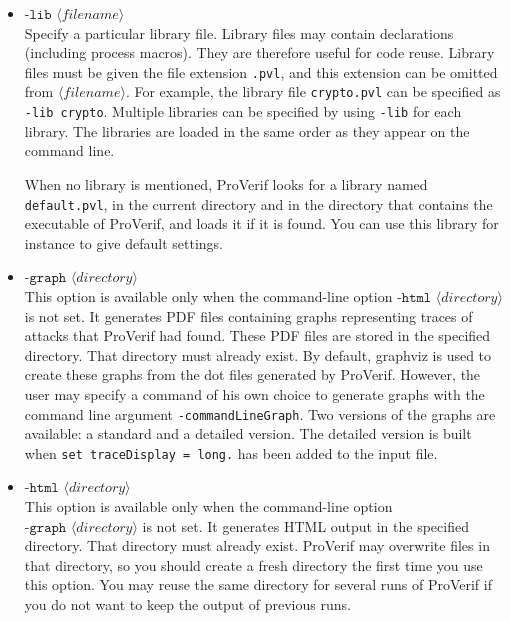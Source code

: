 \documentclass{book}
\newcommand{\nonterm}[1]{\langle\mathit{#1}\rangle}
\begin{document}
\begin{itemize}
\item $\texttt{-lib }\nonterm{filename}$\\
Specify a particular library file. Library files may contain declarations (including process macros). They are therefore useful for code reuse. Library files must be given the file extension \texttt{.pvl}, and this extension can be omitted from $\nonterm{filename}$. For example, the library file \texttt{crypto.pvl} can be specified as \texttt{-lib crypto}. Multiple libraries can be specified by using \texttt{-lib} for each library. The libraries are loaded in the same order as they appear on the command line.

When no library is mentioned, ProVerif looks for a library named \texttt{default.pvl}, in the current directory and in the directory that contains the executable of ProVerif, and loads it if it is found. You can use this library for instance to give default settings.



\item $\texttt{-graph }\nonterm{directory}$ \\
  This option is available only when the command-line option
  $\texttt{-html }\nonterm{directory}$ is not set. It
  generates PDF files containing graphs representing traces of attacks
  that ProVerif had found. These PDF files are stored in the specified directory.
  That directory must already exist. By default, graphviz is used to
  create these graphs from the dot files generated by ProVerif. However, the user may specify a
  command of his own choice to generate graphs with the command line argument
  \texttt{-commandLineGraph}. Two versions of the graphs are available: a standard and a
  detailed version. The detailed version is built when
  \lstinline!set traceDisplay = long.! has been added to the input file.

\item $\texttt{-html }\nonterm{directory}$ \\
  This option is available only when the command-line option
  $\texttt{-graph }\nonterm{directory}$ is not set.
  It generates HTML output in the specified directory. That directory
  must already exist. ProVerif may overwrite files in that directory,
  so you should create a fresh directory the first time you use this
  option. You may reuse the same directory for several runs of
  ProVerif if you do not want to keep the output of previous runs.


\end{itemize}
\end{document}
